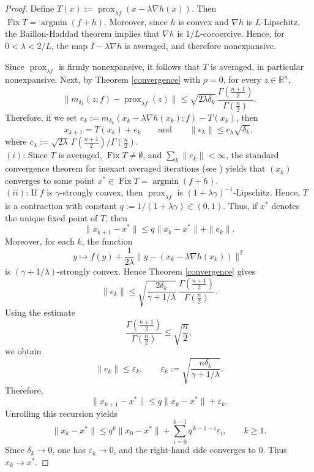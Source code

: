 \documentclass[11pt]{article}
\newcommand{\1}{\mathds{1}}
\theoremstyle{definition}
\theoremstyle{remark}
\theoremstyle{definition}
\DeclareMathOperator{\argmin}{argmin}
\newcommand{\R}{\mathbb{R}}
\begin{document}
\begin{proof}
Define $T(x):=\operatorname{prox}_{\lambda f}(x-\lambda \nabla h(x))$. Then \(\operatorname{Fix}T=\argmin(f+h)\). Moreover, since \(h\) is convex and \(\nabla h\) is \(L\)-Lipschitz, the Baillon-Haddad theorem \cite[Corollary 18.16]{MR3616647} implies that \(\nabla h\) is \(1/L\)-cocoercive. Hence, for \(0<\lambda<2/L\), the map \(I-\lambda \nabla h\) is averaged, and therefore nonexpansive. 


Since \(\operatorname{prox}_{\lambda f}\) is firmly nonexpansive, it follows that \(T\) is averaged, in particular nonexpansive. Next, by Theorem \ref{convergence} with \(\rho=0\), for every \(z\in\R^n\),
\[
\|m_{\delta_k}(z;f)-\operatorname{prox}_{\lambda f}(z)\|
\le
\sqrt{2\lambda\delta_k}\,
\frac{\Gamma\!\left(\frac{n+1}{2}\right)}
{\Gamma\!\left(\frac{n}{2}\right)}.
\]
Therefore, if we set $e_k:=m_{\delta_k}(x_k-\lambda\nabla h(x_k);f)-T(x_k)$,  then
\[
x_{k+1}=T(x_k)+e_k
\qquad\text{and}\qquad
\|e_k\|
\le
c_\lambda \sqrt{\delta_k},
\]
where $c_\lambda:=\sqrt{2\lambda}\, \Gamma\!\left(\frac{n+1}{2}\right) / \Gamma\!\left(\frac{n}{2}\right)$.\\
$(i)$:  Since \(T\) is averaged, \(\operatorname{Fix}T\neq\emptyset\), and
\(\sum_k \|e_k\|<\infty\), the standard convergence theorem for inexact
averaged iterations (see \cite{MR3942891}) yields that \((x_k)\) converges to some point
\(x^\ast\in \operatorname{Fix}T=\argmin(f+h)\).\\
$(ii)$: If \(f\) is \(\gamma\)-strongly convex, then
\(\operatorname{prox}_{\lambda f}\) is \((1+\lambda\gamma)^{-1}\)-Lipschitz.
 Hence, \(T\) is a contraction with
constant $q:=1/(1+\lambda\gamma)\in(0,1)$. Thus, if \(x^\ast\) denotes the unique fixed point of \(T\), then
\[
\|x_{k+1}-x^\ast\|
\le
q\|x_k-x^\ast\|+\|e_k\|.
\]
Moreover, for each \(k\), the function
\[
y\mapsto f(y)+\frac{1}{2\lambda}\|y-(x_k-\lambda\nabla h(x_k))\|^2
\]
is \((\gamma+1/\lambda)\)-strongly convex. Hence Theorem \ref{convergence}
gives
\[
\|e_k\|
\le
\sqrt{\frac{2\delta_k}{\gamma+1/\lambda}}\,
\frac{\Gamma\!\left(\frac{n+1}{2}\right)}
{\Gamma\!\left(\frac{n}{2}\right)}.
\]
Using the estimate
\[
\frac{\Gamma\!\left(\frac{n+1}{2}\right)}
{\Gamma\!\left(\frac{n}{2}\right)}
\le
\sqrt{\frac{n}{2}},
\]
we obtain
\[
\|e_k\|\le \varepsilon_k,
\qquad
\varepsilon_k:=\sqrt{\frac{n\delta_k}{\gamma+1/\lambda}}.
\]
Therefore,
\[
\|x_{k+1}-x^\ast\|
\le
q\|x_k-x^\ast\|+\varepsilon_k.
\]
Unrolling this recursion yields
\[
\|x_k-x^\ast\|
\le
q^k\|x_0-x^\ast\|
+
\sum_{i=0}^{k-1} q^{\,k-1-i}\varepsilon_i,
\qquad k\ge1.
\]
Since \(\delta_k\to0\), one has \(\varepsilon_k\to0\), and the right-hand
side converges to \(0\). Thus \(x_k\to x^\ast\).
\end{proof}
\end{document}

